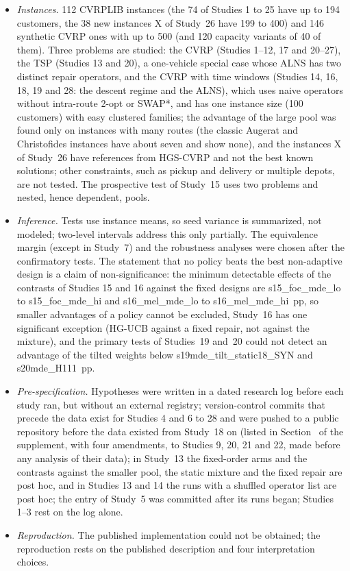 \begin{itemize}
\item \emph{Instances.} 112 CVRPLIB instances (the 74 of Studies 1 to 25 have up to 194 customers, the 38 new instances X of Study~26 have 199 to 400) and 146 synthetic CVRP ones with up to 500 (and 120 capacity variants of 40 of them). Three problems are studied: the CVRP (Studies 1--12, 17 and 20--27), the TSP (Studies 13 and 20), a one-vehicle special case whose ALNS has two distinct repair operators, and the CVRP with time windows (Studies 14, 16, 18, 19 and 28: the descent regime and the ALNS), which uses naive operators without intra-route 2-opt or SWAP*, and has one instance size (100 customers) with easy clustered families; the advantage of the large pool was found only on instances with many routes (the classic Augerat and Christofides instances have about seven and show none), and the instances X of Study~26 have references from HGS-CVRP and not the best known solutions; other constraints, such as pickup and delivery or multiple depots, are not tested. The prospective test of Study~15 uses two problems and nested, hence dependent, pools.
\item \emph{Inference.} Tests use instance means, so seed variance is summarized, not modeled; two-level intervals address this only partially. The equivalence margin (except in Study~7) and the robustness analyses were chosen after the confirmatory tests. The statement that no policy beats the best non-adaptive design is a claim of non-significance: the minimum detectable effects of the contrasts of Studies 15 and 16 against the fixed designs are \num{s15_foc_mde_lo} to \num{s15_foc_mde_hi} and \num{s16_mel_mde_lo} to \num{s16_mel_mde_hi}~pp, so smaller advantages of a policy cannot be excluded, Study~16 has one significant exception (HG-UCB against a fixed repair, not against the mixture), and the primary tests of Studies~19 and~20 could not detect an advantage of the tilted weights below \num{s19mde_tilt_static18_SYN} and \num{s20mde_H111}~pp.
\item \emph{Pre-specification.} Hypotheses were written in a dated research log before each study ran, but without an external registry; version-control commits that precede the data exist for Studies 4 and 6 to 28 and were pushed to a public repository before the data existed from Study~18 on (listed in Section~ of the supplement, with four amendments, to Studies 9, 20, 21 and 22, made before any analysis of their data); in Study~13 the fixed-order arms and the contrasts against the smaller pool, the static mixture and the fixed repair are post hoc, and in Studies 13 and 14 the runs with a shuffled operator list are post hoc; the entry of Study~5 was committed after its runs began; Studies 1--3 rest on the log alone.
\item \emph{Reproduction.} The published implementation could not be obtained; the reproduction rests on the published description and four interpretation choices.
\end{itemize}

